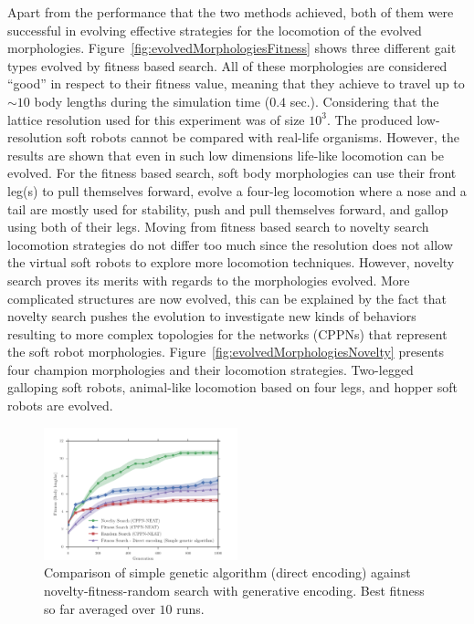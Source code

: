\documentclass{sig-alternate}
\begin{document}
Apart from the performance that the two methods achieved, both of them were successful in evolving effective strategies for the locomotion of the evolved morphologies. Figure~\ref{fig:evolvedMorphologiesFitness} shows three different gait types evolved by fitness based search. All of these morphologies are considered ``good'' in respect to their fitness value, meaning that they achieve to travel up to $\sim 10$ body lengths during the simulation time ($0.4$ sec.). Considering that the lattice resolution used for this experiment was of size $10^3$. The produced low-resolution soft robots cannot be compared with real-life organisms. However, the results are shown that even in such low dimensions life-like locomotion can be evolved. For the fitness based search, soft body morphologies can use their front leg(s) to pull themselves forward, evolve a four-leg locomotion where a nose and a tail are mostly used for stability, push and pull themselves forward, and gallop using both of their legs. Moving from fitness based search to novelty search locomotion strategies do not differ too much since the resolution does not allow the virtual soft robots to explore more locomotion techniques. However, novelty search proves its merits with regards to the morphologies evolved. More complicated structures are now evolved, this can be explained by the fact that novelty search pushes the evolution to investigate new kinds of behaviors resulting to more complex topologies for the networks (CPPNs) that represent the soft robot morphologies. Figure~\ref{fig:evolvedMorphologiesNovelty} presents four champion morphologies and their locomotion strategies. Two-legged galloping soft robots, animal-like locomotion based on four legs, and hopper soft robots are evolved.


\begin{figure}[t!]
\centering
\includegraphics[width=0.5\textwidth]{../Figures/Results/FitNovRandomDirectSize5.pdf}
\caption{Comparison of simple genetic algorithm (direct encoding) against novelty-fitness-random search with generative encoding. Best fitness so far averaged over $10$ runs.}
\label{fig:FitNovRandomDirectSize5}
\end{figure}
\end{document}
